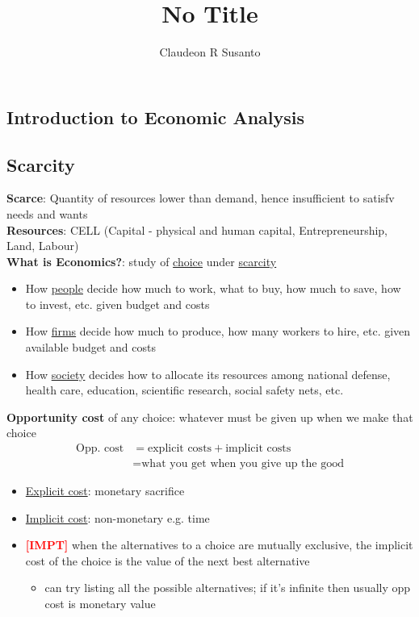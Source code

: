 \documentclass{article}
\title{No Title}
\author{Claudeon R Susanto}
\date{}
\begin{document}
{}\selectfont
\begin{multicols}{2}
\section{Introduction to Economic Analysis}
\subsection{Scarcity}
\textbf{Scarce}: Quantity of resources lower than demand, hence insufficient to satisfv needs and wants\\
\textbf{Resources}: CELL (Capital - physical and human capital, Entrepreneurship, Land, Labour)\\


\textbf{What is Economics?}: study of \underline{choice} under \underline{scarcity}
\begin{itemize}
	\item How \underline{people} decide how much to work, what to buy, how much to save, how to invest, etc. given budget and costs
	\item How \underline{firms} decide how much to produce, how many workers to hire, etc. given available budget and costs
	\item How \underline{society} decides how to allocate its resources among national defense, health care, education, scientific research, social safety nets, etc.\\
\end{itemize}

\textbf{Opportunity cost} of any choice: whatever must be given up when we make that choice
\begin{equation*}
	\begin{aligned}
		\text{Opp. cost} &= \text{explicit costs} +\text{implicit costs}\\
		&= \text{what you get when you give up the good}
	\end{aligned}
\end{equation*}
\begin{itemize}
	\item \underline{Explicit cost}: monetary sacrifice
	\item \underline{Implicit cost}: non-monetary e.g. time
	\item \textcolor{red}{\textbf{[IMPT]}} when the alternatives to a choice are mutually exclusive, the implicit cost of the choice is the value of the next best alternative
	\begin{itemize}
		\item can try listing all the possible alternatives; if it's infinite then usually opp cost is monetary value
	\end{itemize}
\end{itemize}


\end{multicols}
\end{document}
